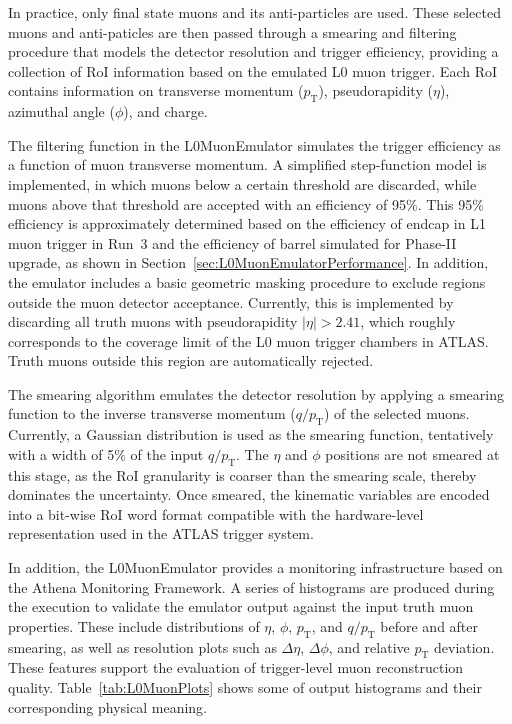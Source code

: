 In practice, only final state muons and its anti-particles are used. These selected muons and anti-paticles are then passed through a smearing and filtering procedure that models the detector resolution and trigger efficiency, providing a collection of RoI information based on the emulated L0 muon trigger. Each RoI contains information on transverse momentum ($p_\mathrm{T}$), pseudorapidity ($\eta$), azimuthal angle ($\phi$), and charge.

The filtering function in the L0MuonEmulator simulates the trigger efficiency as a function of muon transverse momentum. A simplified step-function model is implemented, in which muons below a certain threshold are discarded, while muons above that threshold are accepted with an efficiency of 95\%. This 95\% efficiency is approximately determined based on the efficiency of endcap in L1 muon trigger in Run~3 and the efficiency of barrel simulated for Phase-II upgrade, as shown in Section~\ref{sec:L0MuonEmulatorPerformance}. In addition, the emulator includes a basic geometric masking procedure to exclude regions outside the muon detector acceptance. Currently, this is implemented by discarding all truth muons with pseudorapidity $|\eta| > 2.41$, which roughly corresponds to the coverage limit of the L0 muon trigger chambers in ATLAS. Truth muons outside this region are automatically rejected.

The smearing algorithm emulates the detector resolution by applying a smearing function to the inverse transverse momentum ($q/p_\mathrm{T}$) of the selected muons. Currently, a Gaussian distribution is used as the smearing function, tentatively with a width of 5\% of the input $q/p_\mathrm{T}$. The $\eta$ and $\phi$ positions are not smeared at this stage, as the RoI granularity is coarser than the smearing scale, thereby dominates the uncertainty. Once smeared, the kinematic variables are encoded into a bit-wise RoI word format compatible with the hardware-level representation used in the ATLAS trigger system.

In addition, the L0MuonEmulator provides a monitoring infrastructure based on the Athena Monitoring Framework. A series of histograms are produced during the execution to validate the emulator output against the input truth muon properties. These include distributions of $\eta$, $\phi$, $p_\mathrm{T}$, and $q/p_\mathrm{T}$ before and after smearing, as well as resolution plots such as $\Delta\eta$, $\Delta\phi$, and relative $p_\mathrm{T}$ deviation. These features support the evaluation of trigger-level muon reconstruction quality. Table~\ref{tab:L0MuonPlots} shows some of output histograms and their corresponding physical meaning.



